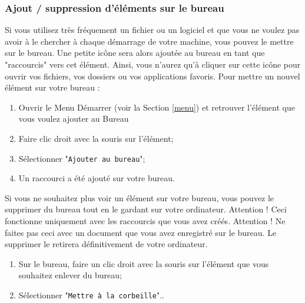 \documentclass[12pt]{book}
\begin{document}
		\subsubsection{Ajout / suppression d'éléments sur le bureau}\label{sec:elementsbureau}
			Si vous utilisez très fréquement un fichier ou un logiciel et que vous ne voulez pas avoir à le chercher à chaque démarrage de votre machine, vous pouvez le mettre sur le bureau. 
			Une petite icône sera alors ajoutée au bureau en tant que "raccourcis" vers cet élément. 
			Ainsi, vous n'aurez qu'à cliquer sur cette icône pour ouvrir vos fichiers, vos dossiers ou vos applications favoris.\newline
			Pour mettre un nouvel élément sur votre bureau :
			\begin{enumerate}
				\item Ouvrir le Menu Démarrer (voir la Section \ref{menu}) et retrouver l'élément que vous voulez ajouter au Bureau
				\item Faire clic droit avec la souris sur l'élément;
				\item Sélectionner "\texttt{Ajouter au bureau}";
				\item Un raccourci a été ajouté sur votre bureau.
			\end{enumerate}\par
			Si vous ne souhaitez plus voir un élément sur votre bureau, vous pouvez le supprimer du bureau tout en le gardant sur votre ordinateur.\newline
			Attention !
			Ceci fonctionne uniquement avec les raccourcis que vous avez créés. 
			Attention ! Ne faites pas ceci avec un document que vous avez enregistré sur le bureau.
			Le supprimer le retirera définitivement de votre ordinateur.
			\begin{enumerate}
				\item Sur le bureau, faire un clic droit avec la souris sur l'élément que vous souhaitez enlever du bureau;
				\item Sélectionner "\texttt{Mettre à la corbeille}"..
			\end{enumerate}
\end{document}
